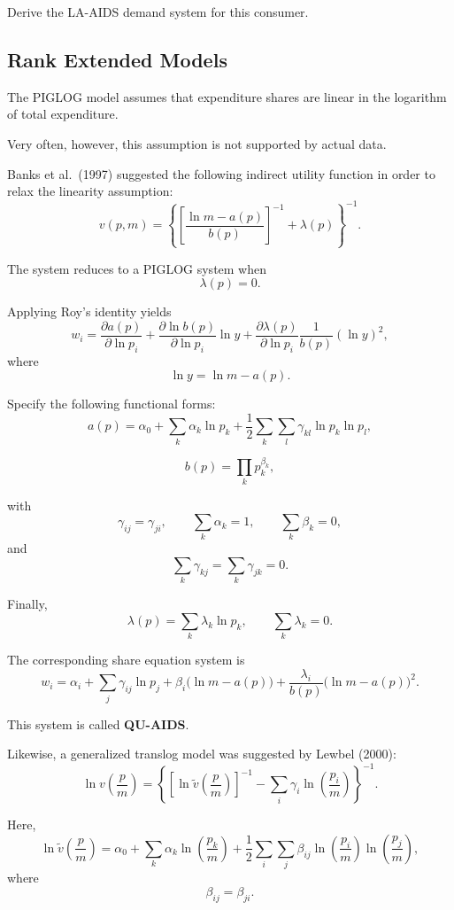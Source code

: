 Derive the LA-AIDS demand system for this consumer.

\subsection{Rank Extended Models}

The PIGLOG model assumes that expenditure shares are linear in the logarithm of total expenditure.

Very often, however, this assumption is not supported by actual data.

Banks et al.\ (1997) suggested the following indirect utility function in order to relax the linearity assumption:
\[
v(p,m)
=
\left\{
\left[
\frac{\ln m-a(p)}{b(p)}
\right]^{-1}
+
\lambda(p)
\right\}^{-1}.
\]

The system reduces to a PIGLOG system when
\[
\lambda(p)=0.
\]

Applying Roy's identity yields
\[
w_i
=
\frac{\partial a(p)}{\partial \ln p_i}
+
\frac{\partial \ln b(p)}{\partial \ln p_i}
\ln y
+
\frac{\partial \lambda(p)}{\partial \ln p_i}
\frac{1}{b(p)}
(\ln y)^2,
\]
where
\[
\ln y
=
\ln m-a(p).
\]

Specify the following functional forms:
\[
a(p)
=
\alpha_0
+
\sum_k \alpha_k\ln p_k
+
\frac{1}{2}
\sum_k\sum_l
\gamma_{kl}\ln p_k\ln p_l,
\]

\[
b(p)
=
\prod_k p_k^{\beta_k},
\]

with
\[
\gamma_{ij}=\gamma_{ji},
\qquad
\sum_k \alpha_k=1,
\qquad
\sum_k \beta_k=0,
\]
and
\[
\sum_k \gamma_{kj}
=
\sum_k \gamma_{jk}
=
0.
\]

Finally,
\[
\lambda(p)
=
\sum_k \lambda_k\ln p_k,
\qquad
\sum_k \lambda_k=0.
\]



The corresponding share equation system is
\[
w_i
=
\alpha_i
+
\sum_j \gamma_{ij}\ln p_j
+
\beta_i\bigl(\ln m-a(p)\bigr)
+
\frac{\lambda_i}{b(p)}
\bigl(\ln m-a(p)\bigr)^2.
\]

This system is called \textbf{QU-AIDS}.

Likewise, a generalized translog model was suggested by Lewbel (2000):
\[
\ln v\left(\frac{p}{m}\right)
=
\left\{
\left[
\ln \tilde v\left(\frac{p}{m}\right)
\right]^{-1}
-
\sum_i \gamma_i \ln\left(\frac{p_i}{m}\right)
\right\}^{-1}.
\]

Here,
\[
\ln \tilde v\left(\frac{p}{m}\right)
=
\alpha_0
+
\sum_k \alpha_k
\ln\left(\frac{p_k}{m}\right)
+
\frac{1}{2}
\sum_i\sum_j
\beta_{ij}
\ln\left(\frac{p_i}{m}\right)
\ln\left(\frac{p_j}{m}\right),
\]
where
\[
\beta_{ij}=\beta_{ji}.
\]

